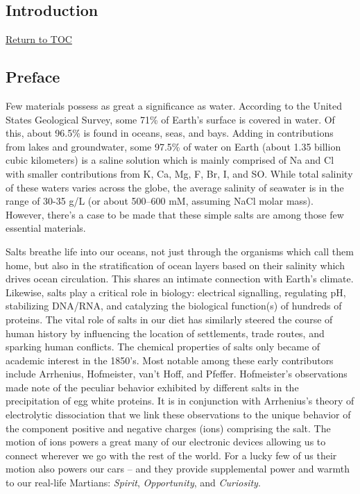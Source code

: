 \begin{intro}
  \chapter{Introduction}
  \hyperlink{toc}{Return to TOC}
  \section{\label{ch1:sec0:level1}Preface}
   Few materials possess as great a significance as water. According to the United States Geological Survey, some 71\% of Earth's surface is covered in water\cite{usgswater}. 
   Of this, about 96.5\% is found in oceans, seas, and bays\cite{usgswater}. Adding in contributions from lakes and groundwater, some 97.5\% of water on Earth (about 1.35 
   billion cubic kilometers)\cite{usgswater} is a saline solution which is mainly comprised of Na\sur{+} and Cl\sur{-} with smaller contributions from K\sur{+}, Ca, 
   Mg, F\sur{-}, Br\sur{-}, I\sur{-}, and SO. While total salinity of these waters varies across the globe, the average salinity of seawater is in the 
   range of 30-35 g/L (or about 500--600 mM, assuming NaCl molar mass)\cite{millero1974physical}. However, there's a case to be made that these simple salts are among those
   few essential materials.
   
   Salts breathe life into our oceans, not just through the organisms which call them home, but also in the stratification of ocean layers based on their salinity which drives
   ocean circulation. This shares an intimate connection with Earth's climate\cite{oceancurrent}. Likewise, salts play a critical role in biology: electrical signalling, regulating 
   pH, stabilizing DNA/RNA, and catalyzing the biological function(s) of hundreds of proteins. The vital role of salts in our diet has similarly steered the course of human 
   history by influencing the location of settlements, trade routes, and sparking human conflicts\cite{multhauf1978neptune}. The chemical properties of salts only became of 
   academic interest in the 1850's\cite{multhauf1978neptune}. Most notable among these early contributors include Arrhenius, Hofmeister, van't Hoff, and Pfeffer. Hofmeister's
   observations made note of the peculiar behavior exhibited by different salts in the precipitation of egg white proteins. It is in conjunction with Arrhenius's theory of 
   electrolytic dissociation that we link these observations to the unique behavior of the component positive and negative charges (ions) comprising the salt. The motion of
   ions powers a great many of our electronic devices allowing us to connect wherever we go with the rest of the world. For a lucky few of us their motion also powers our 
   cars -- and they provide supplemental power and warmth to our real-life Martians: \emph{Spirit}, \emph{Opportunity}, and \emph{Curiosity}\cite{ratnakumar2006li}.
   

\end{intro}
